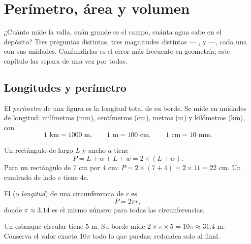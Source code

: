 \chapter{Perímetro, área y volumen}\label{ch:g6:measure}

¿Cuánto mide la valla, cuán grande es el campo, cuánta agua cabe en el
depósito? Tres preguntas distintas, tres magnitudes distintas ---
,  y  ---, cada una con sus unidades. Confundirlas es
el error más frecuente en geometría; este capítulo las separa de una vez por
todas.

\section{Longitudes y perímetro}

\begin{definition}[Perímetro]\label{def:g6:measure:perimeter}
El \emph{perímetro} de una figura es la longitud total
de su borde. Se mide en unidades de longitud: milímetros (mm),
centímetros (cm), metros (m) y kilómetros (km), con
\[
1 \text{ km} = 1000 \text{ m}, \qquad
1 \text{ m} = 100 \text{ cm}, \qquad
1 \text{ cm} = 10 \text{ mm}.
\]
\end{definition}

\begin{example}\label{ex:g6:measure:perimeter}
Un rectángulo de largo $L$ y ancho $a$ tiene 
\[
P = L + w + L + w = 2 \times (L + w).
\]
Para un rectángulo de $7$ cm por $4$ cm: $P = 2 \times (7 + 4) = 2 \times 11 =
22$ cm. Un cuadrado de lado $c$ tiene  $4c$.
\end{example}

\begin{proposition}\label{prop:g6:measure:circle}
El  (o \emph{longitud}) de una circunferencia de  $r$ es
\[
P = 2 \pi r ,
\]
donde $\pi \approx 3.14$ es el mismo número para todas las circunferencias.
\end{proposition}
\admitted

\begin{example}
Un estanque circular tiene  $5$ m. Su borde mide
$2 \times \pi \times 5 = 10\pi \approx 31.4$ m. Conserva el valor exacto
$10\pi$ todo lo que puedas; redondea solo al final.
\end{example}

